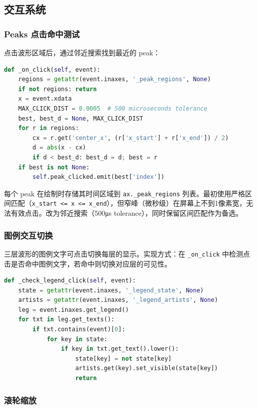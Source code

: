 \documentclass[12pt,a4paper]{article}
\begin{document}
\subsection{交互系统}

\subsubsection{Peaks 点击命中测试}

点击波形区域后，通过邻近搜索找到最近的 peak：

\begin{lstlisting}[language=Python]
def _on_click(self, event):
    regions = getattr(event.inaxes, '_peak_regions', None)
    if not regions: return
    x = event.xdata
    MAX_CLICK_DIST = 0.0005  # 500 microseconds tolerance
    best, best_d = None, MAX_CLICK_DIST
    for r in regions:
        cx = r.get('center_x', (r['x_start'] + r['x_end']) / 2)
        d = abs(x - cx)
        if d < best_d: best_d = d; best = r
    if best is not None:
        self.peak_clicked.emit(best['index'])
\end{lstlisting}

每个 peak 在绘制时存储其时间区域到 \texttt{ax.\_peak\_regions} 列表。最初使用严格区间匹配（\texttt{x\_start <= x <= x\_end}），但窄峰（微秒级）在屏幕上不到1像素宽，无法有效点击。改为邻近搜索（500μs tolerance），同时保留区间匹配作为备选。

\subsubsection{图例交互切换}

三层波形的图例文字可点击切换每层的显示。实现方式：在 \texttt{\_on\_click} 中检测点击是否命中图例文字，若命中则切换对应层的可见性。

\begin{lstlisting}[language=Python]
def _check_legend_click(self, event):
    state = getattr(event.inaxes, '_legend_state', None)
    artists = getattr(event.inaxes, '_legend_artists', None)
    leg = event.inaxes.get_legend()
    for txt in leg.get_texts():
        if txt.contains(event)[0]:
            for key in state:
                if key in txt.get_text().lower():
                    state[key] = not state[key]
                    artists.get(key).set_visible(state[key])
                    return
\end{lstlisting}

\subsubsection{滚轮缩放}
\end{document}
